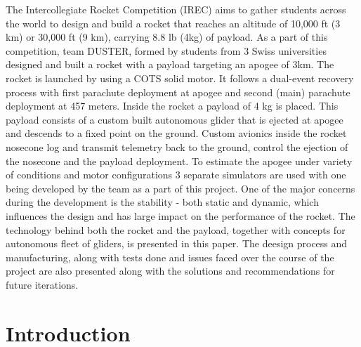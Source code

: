 \documentclass[]{iac}
\begin{document}
{The Intercollegiate Rocket Competition (IREC) aims to gather students across the world to design and build a rocket that reaches an altitude of 10,000 ft (3 km) or 30,000 ft (9 km), carrying 8.8 lb (4kg) of payload. As a part of this competition, team DUSTER, formed by students from 3 Swiss universities designed and built a rocket with a payload targeting an apogee of 3km. The rocket is launched by using a COTS solid motor.
It follows a dual-event recovery process with first parachute deployment at apogee and second (main) parachute deployment at 457 meters.
Inside the rocket a payload of 4 kg is placed.
This payload consists of a custom built autonomous glider that is ejected at apogee and descends to a fixed point on the ground.
Custom avionics inside the rocket nosecone log and transmit telemetry back to the ground, control the ejection of the nosecone and the payload deployment.
To estimate the apogee under variety of conditions and motor configurations 3 separate simulators are used with one being developed by the team as a part of this project. One of the major concerns during the development is the stability - both static and dynamic, which influences the design and has large impact on the performance of the rocket.
The technology behind both the rocket and the payload, together with concepts for autonomous fleet of gliders, is presented in this paper. The deesign process and manufacturing, along with tests done and issues faced over the course of the project are also presented along with the solutions and recommendations for future iterations.
}

\maketitle
\section{Introduction}


\end{document}
